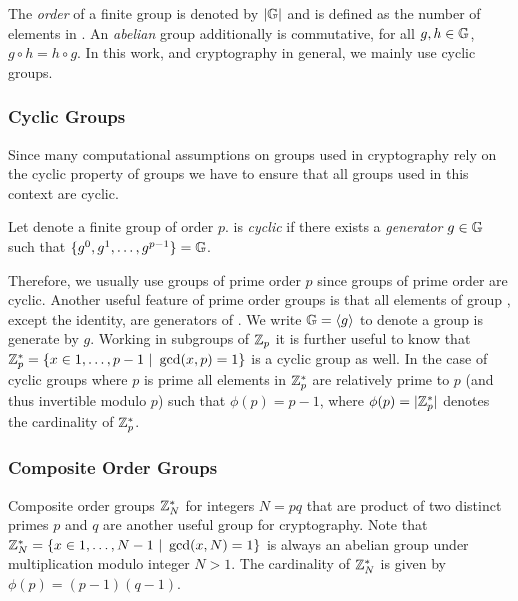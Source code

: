 \noindent
The \emph{order} of a finite group \GG is denoted by $|\mathbb{G}|$ and is defined as the number of elements in \GG.
An \emph{abelian} group additionally is commutative, \ie for all $g,h\in\mathbb{G}$, $g\circ h=h\circ g$.
In this work, and cryptography in general, we mainly use cyclic groups.

\subsubsection{Cyclic Groups}
Since many computational assumptions on groups used in cryptography rely on the cyclic property of groups we have to ensure that all groups used in this context are cyclic.

\begin{definition}\label{def:cyclicgroups}
Let \GG denote a finite group of order $p$.
\GG is \emph{cyclic} if there exists a \emph{generator} $g\in\mathbb{G}$ such that $\{g^0,g^1,\dots,g^{p-1}\}=\mathbb{G}$.
\eod
\end{definition}

\noindent
Therefore, we usually use groups of prime order $p$ since groups of prime order are cyclic.
Another useful feature of prime order groups is that all elements of group \GG, except the identity, are generators of \GG.
We write $\mathbb{G}=\langle g_{} \rangle$ to denote a group \GG is generate by $g$.
Working in subgroups of $\mathbb{Z}_p$ it is further useful to know that $\mathbb{Z}^\ast_p=\{x\in{1,\dots,p-1}~|~\gcd(x,p)=1\}$ is a cyclic group as well.
In the case of cyclic groups where $p$ is prime all elements in $\mathbb{Z}^\ast_p$ are relatively prime to $p$ (and thus invertible modulo $p$) such that $\phi(p)=p-1$, where $\phi(p)=|\mathbb{Z}^\ast_p|$ denotes the cardinality of $\mathbb{Z}^\ast_p$.

\subsubsection{Composite Order Groups}
Composite order groups $\mathbb{Z}^\ast_N$ for integers $N=pq$ that are product of two distinct primes $p$ and $q$ are another useful group for cryptography.
Note that $\mathbb{Z}^\ast_N=\{x\in{1,\dots,N-1}~|~\gcd(x,N)=1\}$ is always an abelian group under multiplication modulo integer $N>1$.
The cardinality of $\mathbb{Z}^\ast_N$ is given by $\phi(p)=(p-1)(q-1)$.

